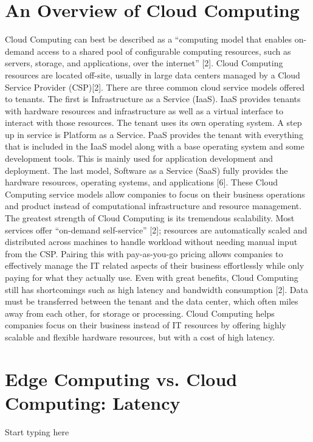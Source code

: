 \documentclass[conference]{IEEEtran}
\begin{document}
\section{An Overview of Cloud Computing}
Cloud Computing can best be described as a “computing model that enables on-demand access to a shared pool of configurable computing resources, such as servers, storage, and applications, over the internet” [2]. Cloud Computing resources are located off-site, usually in large data centers managed by a Cloud Service Provider (CSP)[2]. There are three common cloud service models offered to tenants. The first is Infrastructure as a Service (IaaS). IaaS provides tenants with hardware resources and infrastructure as well as a virtual interface to interact with those resources. The tenant uses its own operating system. A step up in service is Platform as a Service. PaaS provides the tenant with everything that is included in the IaaS model along with a base operating system and some development tools. This is mainly used for application development and deployment. The last model, Software as a Service (SaaS) fully provides the hardware resources, operating systems, and applications [6]. These Cloud Computing service models allow companies to focus on their business operations and product instead of computational infrastructure and resource management.
The greatest strength of Cloud Computing is its tremendous scalability. Most services offer “on-demand self-service” [2]; resources are automatically scaled and distributed across machines to handle workload without needing manual input from the CSP. Pairing this with pay-as-you-go pricing allows companies to effectively manage the IT related aspects of their business effortlessly while only paying for what they actually use. Even with great benefits, Cloud Computing still has shortcomings such as high latency and bandwidth consumption [2]. Data must be transferred between the tenant and the data center, which often miles away from each other, for storage or processing. Cloud Computing helps companies focus on their business instead of IT resources by offering highly scalable and flexible hardware resources, but with a cost of high latency.

\section{Edge Computing vs. Cloud Computing: Latency}
Start typing here
\end{document}
